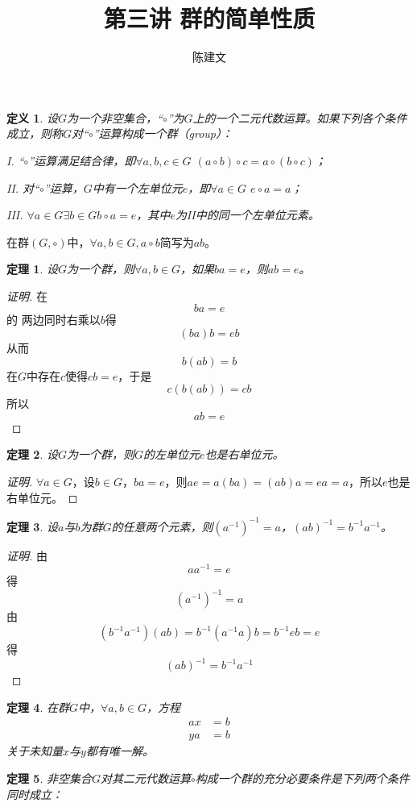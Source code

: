 \documentclass{article}
\newtheorem{Def}{定义}
\newtheorem{Thm}{定理}
\begin{document}
\begin{CJK*}{UTF8}{gbsn}
  \title{第三讲 群的简单性质}
  \author{陈建文}
  \maketitle
  

\begin{Def}
  设$G$为一个非空集合，“$\circ$”为$G$上的一个二元代数运算。如果下列各个条件成立，则称$G$对“$\circ$”运算构成一个群（group）：

  I. “$\circ$”运算满足结合律，即$\forall a,b,c \in G$ $(a\circ b)\circ c = a\circ(b\circ c)$；

  II. 对“$\circ$”运算，$G$中有一个左单位元$e$，即$\forall a\in G$ $e\circ a = a$；

  III. $\forall a\in G \exists b\in G b\circ a = e$，其中$e$为II中的同一个左单位元素。
\end{Def}
在群$(G,\circ)$中，$\forall a,b\in G, a\circ b$简写为$ab$。
\begin{Thm}
  设$G$为一个群，则$\forall a,b\in G$，如果$ba=e$，则$ab=e$。
\end{Thm}
\begin{proof}[证明]
  在\[ba=e\]的
  两边同时右乘以$b$得
  \[(ba)b=eb\]
  从而
  \[b(ab)=b\]
  在$G$中存在$c$使得$cb=e$，于是
  \[c(b(ab))=cb\]
  所以
  \[ab=e\]
\end{proof}
\begin{Thm}
  设$G$为一个群，则$G$的左单位元$e$也是右单位元。
\end{Thm}
\begin{proof}[证明]
  $\forall a\in G$，设$b\in G$，$ba=e$，则$ae=a(ba)=(ab)a=ea=a$，所以$e$也是右单位元。
\end{proof}
\begin{Thm}
  设$a$与$b$为群$G$的任意两个元素，则$(a^{-1})^{-1}=a$，$(ab)^{-1}=b^{-1}a^{-1}$。
\end{Thm}
\begin{proof}[证明]
  由\[aa^{-1}=e\]
  得\[(a^{-1})^{-1}=a\]
由\[(b^{-1}a^{-1})(ab)=b^{-1}(a^{-1}a)b=b^{-1}eb=e\]
得\[(ab)^{-1}=b^{-1}a^{-1}\]
\end{proof}
\begin{Thm}
 在群$G$中，$\forall a, b \in G$，方程
 \begin{align*}
  ax&=b\\
  ya&=b
 \end{align*}
 关于未知量$x$与$y$都有唯一解。 
\end{Thm}

\begin{Thm}
  非空集合$G$对其二元代数运算$\circ$构成一个群的充分必要条件是下列两个条件同时成立：


\end{Thm}
\end{CJK*}
\end{document}
